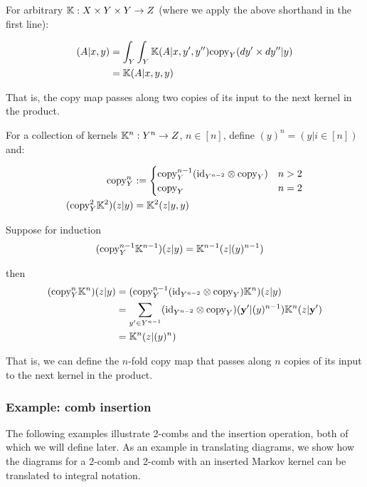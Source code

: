 For arbitrary $\mathbb{K}: X\times Y\times Y\to Z$ (where we apply the above shorthand in the first line):

\begin{align}
 [(\text{id}_X\otimes \text{copy}_Y)\kernel{K}](A|x,y) &= \int_Y\int_Y \kernel{K}(A|x,y',y'') \text{copy}_Y(dy'\times dy''|y)\\
										   &= \kernel{K}(A|x,y,y)
\end{align}

That is, the copy map passes along two copies of its input to the next kernel in the product. 

For a collection of kernels $\mathbb{K}^n:Y^n\to Z$, $n\in[n]$, define $(y)^{n}=(y|i\in[n])$ and:

\begin{align}
	\text{copy}^n_Y &:= \begin{cases}
	\text{copy}^{n-1}_Y(\text{id}_{Y^{n-2}}\otimes \text{copy}_Y) & n>2\\
	\text{copy}_Y & n=2
	\end{cases}\\
	(\text{copy}^2_Y\mathbb{K}^2)(z|y) &= \mathbb{K}^2(z|y,y)\\
\end{align}

Suppose for induction
\begin{align}
(\text{copy}^{n-1}_Y\mathbb{K}^{n-1})(z|y) &= \mathbb{K}^{n-1}(z|(y)^{n-1})
\end{align}

then
\begin{align}
(\text{copy}^n_Y\mathbb{K}^n)(z|y) &= (\text{copy}^{n-1}_Y(\text{id}_{Y^{n-2}}\otimes \text{copy}_Y)\mathbb{K}^n)(z|y)\\
									 &= \sum_{y'\in Y^{n-1}}(\text{id}_{Y^{n-2}}\otimes \text{copy}_Y)(\mathbf{y}'|(y)^{n-1})\mathbb{K}^n(z|\mathbf{y}')\\
									 &= \mathbb{K}^n(z|(y)^n)
\end{align}

That is, we can define the $n$-fold copy map that passes along $n$ copies of its input to the next kernel in the product.

\subsubsection{Example: comb insertion}

The following examples illustrate 2-combs and the insertion operation, both of which we will define later. As an example in translating diagrams, we show how the diagrams for a 2-comb and 2-comb with an inserted Markov kernel can be translated to integral notation.

